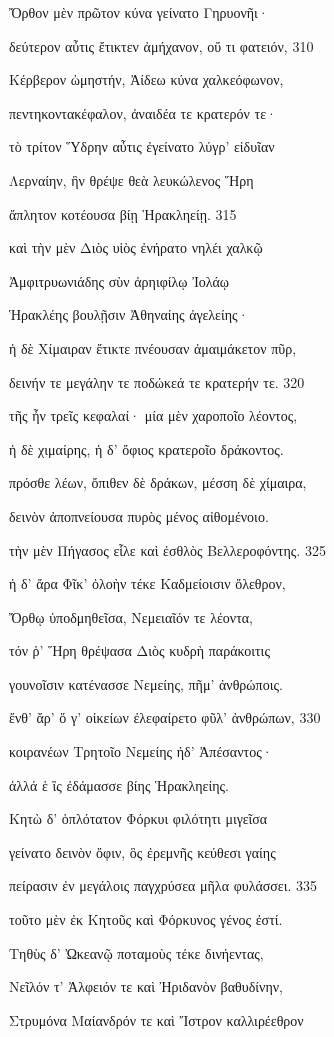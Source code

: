 Ὄρθον μὲν πρῶτον κύνα γείνατο Γηρυονῆι· 

δεύτερον αὖτις ἔτικτεν ἀμήχανον, οὔ τι φατειόν, 310 

Κέρβερον ὠμηστήν, Ἀίδεω κύνα χαλκεόφωνον,

πεντηκοντακέφαλον, ἀναιδέα τε κρατερόν τε· 

τὸ τρίτον Ὕδρην αὖτις ἐγείνατο λύγρ' εἰδυῖαν 

Λερναίην, ἣν θρέψε θεὰ λευκώλενος Ἥρη

ἄπλητον κοτέουσα βίῃ Ἡρακληείῃ. 315

καὶ τὴν μὲν Διὸς υἱὸς ἐνήρατο νηλέι χαλκῷ

Ἀμφιτρυωνιάδης σὺν ἀρηιφίλῳ Ἰολάῳ

Ἡρακλέης βουλῇσιν Ἀθηναίης ἀγελείης·

ἡ δὲ Χίμαιραν ἔτικτε πνέουσαν ἀμαιμάκετον πῦρ,

δεινήν τε μεγάλην τε ποδώκεά τε κρατερήν τε. 320 

τῆς ἦν τρεῖς κεφαλαί· μία μὲν χαροποῖο λέοντος,

ἡ δὲ χιμαίρης, ἡ δ' ὄφιος κρατεροῖο δράκοντος.

πρόσθε λέων, ὄπιθεν δὲ δράκων, μέσση δὲ χίμαιρα,

δεινὸν ἀποπνείουσα πυρὸς μένος αἰθομένοιο.

τὴν μὲν Πήγασος εἷλε καὶ ἐσθλὸς Βελλεροφόντης. 325

ἡ δ' ἄρα Φῖκ' ὀλοὴν τέκε Καδμείοισιν ὄλεθρον,

Ὄρθῳ ὑποδμηθεῖσα, Νεμειαῖόν τε λέοντα, 

τόν ῥ' Ἥρη θρέψασα Διὸς κυδρὴ παράκοιτις

γουνοῖσιν κατένασσε Νεμείης, πῆμ' ἀνθρώποις.

ἔνθ' ἄρ' ὅ γ' οἰκείων ἐλεφαίρετο φῦλ' ἀνθρώπων, 330

κοιρανέων Τρητοῖο Νεμείης ἠδ' Ἀπέσαντος· 

ἀλλά ἑ ἲς ἐδάμασσε βίης Ἡρακληείης.

Κητὼ δ' ὁπλότατον Φόρκυι φιλότητι μιγεῖσα

γείνατο δεινὸν ὄφιν, ὃς ἐρεμνῆς κεύθεσι γαίης

πείρασιν ἐν μεγάλοις παγχρύσεα μῆλα φυλάσσει. 335

τοῦτο μὲν ἐκ Κητοῦς καὶ Φόρκυνος γένος ἐστί. 

Τηθὺς δ' Ὠκεανῷ ποταμοὺς τέκε δινήεντας,

Νεῖλόν τ' Ἀλφειόν τε καὶ Ἠριδανὸν βαθυδίνην,

Στρυμόνα Μαίανδρόν τε καὶ Ἴστρον καλλιρέεθρον


